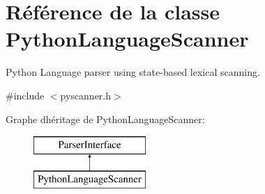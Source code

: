 \hypertarget{class_python_language_scanner}{}\section{Référence de la classe Python\+Language\+Scanner}
\label{class_python_language_scanner}


Python Language parser using state-\/based lexical scanning.  




{\ttfamily \#include $<$pyscanner.\+h$>$}

Graphe d\textquotesingle{}héritage de Python\+Language\+Scanner\+:\begin{figure}[H]
\begin{center}
\leavevmode
\includegraphics[height=2.000000cm]{class_python_language_scanner}
\end{center}
\end{figure}
